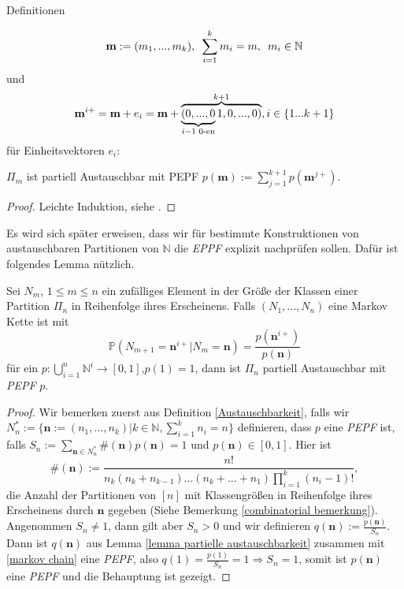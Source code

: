 \begin{section}{Definitionen}
\begin{lemma}
    \[
    \textbf{m} := (m_1,...,m_k), \hspace*{5pt} \sum_{i=1}^{k}m_i = m,\hspace*{5pt} m_i \in \mathbb{N} 
    \]
    und 
    \[ 
    \textbf{m}^{i+} = \textbf{m} + e_i =\textbf{m} + \overbrace{\underbrace{(0,...,0}_{i-1 \textnormal{ 0-en}}1,0,...,0)}^{k+1} , i \in \{1...k+1\}
    \]
     für Einheitsvektoren $e_i$:
\begin{center} 
    $\Pi_m$ ist partiell Austauschbar mit PEPF $p(\textbf{m}):=  \sum_{j=1}^{k+1} p(\textbf{m}^{j+})$.
\end{center}
\end{lemma}
\begin{proof}
    Leichte Induktion, siehe \cite[Proposition 10]{pitman1995exchangeable}.
\end{proof}
\begin{Bemerkung}
    Es wird sich später erweisen, dass wir für bestimmte Konstruktionen von austauschbaren Partitionen von $\mathbb{N}$ die \textit{EPPF} explizit nachprüfen sollen. Dafür ist folgendes Lemma nützlich.
\end{Bemerkung}
\begin{lemma}
    \label{Austauschbar Lemma}
    Sei $N_m$, $1 \leq m \leq n$ ein zufälliges Element in der Größe der Klassen einer Partition $\Pi_n$ in Reihenfolge ihres Erscheinens. Falls $(N_1,...,N_n)$ eine Markov Kette ist mit 
    \begin{equation}
    \label{markov chain}
    \mathbb{P}(N_{m+1} = \textbf{n}^{i+} | N_{m} = \textbf{n}) = \frac{p(\textbf{n}^{i+})}{p(\textbf{n})} 
    \end{equation}
   für ein $p: \bigcup_{i = 1}^{n}\mathbb{N}^i \rightarrow [0,1]$,$p(1) = 1$, dann ist $\Pi_n$ partiell Austauschbar mit \textit{PEPF} $p$.
\end{lemma}
\begin{proof}
    Wir bemerken zuerst aus Definition \ref{Austauschbarkeit}, falls wir $N^*_n:= \{\textbf{n}:= (n_1,...,n_k)|k \in \mathbb{N},\sum_{i=1}^{k}n_i = n\}$ definieren, dass $p$ eine \textit{PEPF} ist, falls $S_n := \sum_{\textbf{n} \in N^*_n}\#(\textbf{n})p(\textbf{n}) = 1$ und $p(\textbf{n}) \in [0,1]$. Hier ist 
    \begin{equation}
        \label{combinatorial equation}
        \#(\textbf{n}):= \frac{n!}{n_k(n_k + n_{k-1})...(n_k+...+n_1)\prod_{i=1}^{k}(n_i-1)!},
    \end{equation}
    die Anzahl der Partitionen von $[n]$ mit Klassengrößen in Reihenfolge ihres Erscheinens durch $\textbf{n}$ gegeben (Siehe Bemerkung \ref{combinatorial bemerkung}). Angenommen $S_n \neq 1$, dann gilt aber $S_n> 0$ und wir definieren $q(\textbf{n}) := \frac{p(\textbf{n})}{S_n}$. Dann ist $q(\textbf{n})$ aus Lemma \ref{lemma partielle austauschbarkeit} zusammen mit \ref{markov chain} eine \textit{PEPF}, also $q(1) = \frac{p(1)}{S_n} = 1 \Rightarrow S_n =1$, somit ist $p(\textbf{n})$ eine \textit{PEPF} und die Behauptung ist gezeigt. 

\end{proof}
\end{section}
